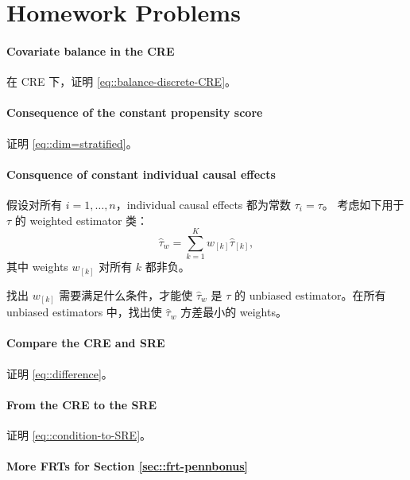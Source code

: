  
 
 \section{Homework Problems}
 
 
  \paragraph{Covariate balance in the CRE}\label{hw::balance-discrete-CRE}
  
 在 CRE 下，证明 \eqref{eq::balance-discrete-CRE}。
 
 \paragraph{Consequence of the constant propensity score}
\label{hw::sre-additional-neyman}

证明 \eqref{eq::dim=stratified}。


\paragraph{Consquence of constant individual causal effects}

假设对所有 $i=1,\ldots, n$，individual causal effects 都为常数 $\tau_i = \tau$。
考虑如下用于 $\tau$ 的 weighted estimator 类：
$$
\hat{\tau}_w = \sum_{k=1}^K  w_{[k]}  \hat{\tau}_{[k]} ,
$$
其中 weights $w_{[k]}  $ 对所有 $k$ 都非负。

找出 $w_{[k]}$ 需要满足什么条件，才能使 $\hat{\tau}_w $ 是 $\tau$ 的 unbiased estimator。在所有 unbiased estimators 中，找出使 $\hat{\tau}_w$ 方差最小的 weights。


\paragraph{Compare the CRE and SRE}\label{hw::compare-CRE-SRE}

证明 \eqref{eq::difference}。



\paragraph{From the CRE to the SRE}\label{hw::CRE-SRE}


证明 \eqref{eq::condition-to-SRE}。


 
 \paragraph{More FRTs for Section \ref{sec::frt-pennbonus}}\label{hw::FRT-SRE-more}
 
